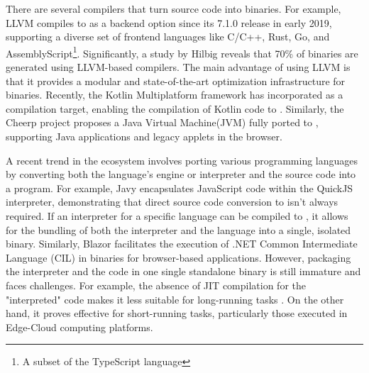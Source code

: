 There are several compilers that turn source code into \Wasm binaries. 
For example, LLVM compiles to \Wasm as a backend option since its 7.1.0 release in early 2019, supporting a diverse set of frontend languages like C/C++, Rust, Go, and AssemblyScript\footnote{A subset of the TypeScript language}.
Significantly, a study by Hilbig \cite{Hilbig2021AnES} reveals that 70\% of \Wasm binaries are generated using LLVM-based compilers. 
The main advantage of using LLVM is that it provides a modular and state-of-the-art optimization infrastructure for \Wasm binaries.
Recently, the Kotlin Multiplatform framework  has incorporated \Wasm as a compilation target, enabling the compilation of Kotlin code to \Wasm.
Similarly, the Cheerp project proposes a Java Virtual Machine(JVM) fully ported to \Wasm, supporting Java applications and legacy applets in the browser. 

\pagebreak

\pagebreak

A recent trend in the \Wasm ecosystem involves porting various programming languages by converting both the language's engine or interpreter and the source code into a \Wasm program. 
For example, Javy encapsulates JavaScript code within the QuickJS interpreter, demonstrating that direct source code conversion to \Wasm isn't always required. 
If an interpreter for a specific language can be compiled to \Wasm, it allows for the bundling of both the interpreter and the language into a single, isolated \Wasm binary. 
Similarly, Blazor facilitates the execution of .NET Common Intermediate Language (CIL) in \Wasm binaries for browser-based applications. 
However, packaging the interpreter and the code in one single standalone \Wasm binary is still immature and faces challenges.
For example, the absence of JIT compilation for the "interpreted" code makes it less suitable for long-running tasks \cite{10.1145/3487552.3487827, 10.1145/3593434.3593454}. 
On the other hand, it proves effective for short-running tasks, particularly those executed in Edge-Cloud computing platforms.



\label{background:wasm:binary}

